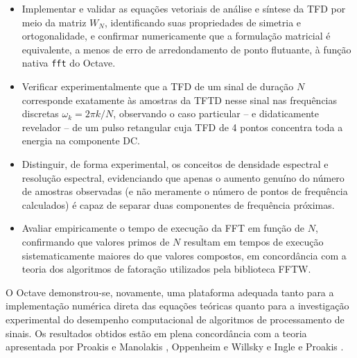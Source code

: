 \documentclass[tcc]{classe_uftex/uftex}
\begin{document}
\begin{itemize}
  \item Implementar e validar as equações vetoriais de análise e síntese da TFD por meio da matriz $W_N$, identificando suas propriedades de simetria e ortogonalidade, e confirmar numericamente que a formulação matricial é equivalente, a menos de erro de arredondamento de ponto flutuante, à função nativa \texttt{fft} do Octave.
  \item Verificar experimentalmente que a TFD de um sinal de duração $N$ corresponde exatamente às amostras da TFTD nesse sinal nas frequências discretas $\omega_k = 2\pi k/N$, observando o caso particular -- e didaticamente revelador -- de um pulso retangular cuja TFD de 4 pontos concentra toda a energia na componente DC.
  \item Distinguir, de forma experimental, os conceitos de densidade espectral e resolução espectral, evidenciando que apenas o aumento genuíno do número de amostras observadas (e não meramente o número de pontos de frequência calculados) é capaz de separar duas componentes de frequência próximas.
  \item Avaliar empiricamente o tempo de execução da FFT em função de $N$, confirmando que valores primos de $N$ resultam em tempos de execução sistematicamente maiores do que valores compostos, em concordância com a teoria dos algoritmos de fatoração utilizados pela biblioteca FFTW.
\end{itemize}

O Octave \cite{octaveman} demonstrou-se, novamente, uma plataforma adequada tanto para a implementação numérica direta das equações teóricas quanto para a investigação experimental do desempenho computacional de algoritmos de processamento de sinais. Os resultados obtidos estão em plena concordância com a teoria apresentada por Proakis e Manolakis \cite{proakis_manolakis}, Oppenheim e Willsky \cite{oppenheim_willsky} e Ingle e Proakis \cite{ingle2017}.

\backmatter
\singlespacing

\end{document}
